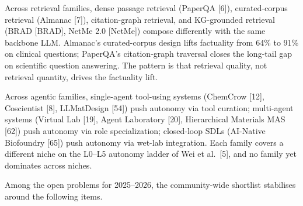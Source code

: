 Across retrieval families, dense passage retrieval (PaperQA {[}6{]}), curated-corpus retrieval (Almanac {[}7{]}), citation-graph retrieval, and KG-grounded retrieval (BRAD {[}BRAD{]}, NetMe 2.0 {[}NetMe{]}) compose differently with the same backbone LLM. Almanac's curated-corpus design lifts factuality from 64\% to 91\% on clinical questions; PaperQA's citation-graph traversal closes the long-tail gap on scientific question answering. The pattern is that retrieval quality, not retrieval quantity, drives the factuality lift.

Across agentic families, single-agent tool-using systems (ChemCrow {[}12{]}, Coscientist {[}8{]}, LLMatDesign {[}54{]}) push autonomy via tool curation; multi-agent systems (Virtual Lab {[}19{]}, Agent Laboratory {[}20{]}, Hierarchical Materials MAS {[}62{]}) push autonomy via role specialization; closed-loop SDLs (AI-Native Biofoundry {[}65{]}) push autonomy via wet-lab integration. Each family covers a different niche on the L0--L5 autonomy ladder of Wei et al.~{[}5{]}, and no family yet dominates across niches.

Among the open problems for 2025--2026, the community-wide shortlist stabilises around the following items.

